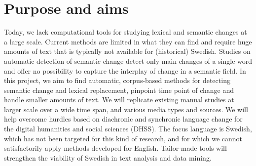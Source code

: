 \documentclass[12pt,twoside,a4paper]{article}
\begin{document}
\fontsize{11.9}{12.4}\selectfont 
	
	
	\section{Purpose and aims}
    Today, we lack computational tools for studying lexical and semantic changes at a large scale. Current methods are limited in what they can find and require huge amounts of text that is typically not available for (historical) Swedish. Studies on automatic detection of semantic change detect only main changes of a single word and offer no possibility to capture the interplay of change in a semantic field. In this project, we aim to find automatic, corpus-based methods for detecting semantic change and lexical replacement, pinpoint time point of change and handle smaller amounts of text. We will replicate existing manual studies at larger scale over a wide time span, and various media types and sources. We will help overcome hurdles based on diachronic and synchronic language change for the digital humanities and social sciences (DHSS).
    The focus language is Swedish, which has not been targeted for this kind of research, and for which we cannot satisfactorily apply methods developed for English. Tailor-made tools will strengthen the viability of Swedish in text analysis and data mining. 
    
\end{document}
